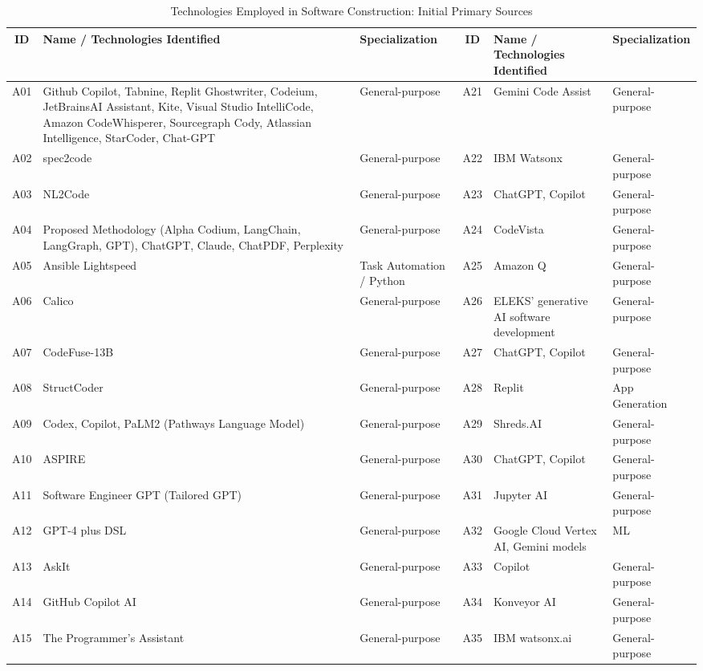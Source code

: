 \begin{table}[ht]
\centering
\caption{Technologies Employed in Software Construction: Initial Primary Sources}
\label{tab:results}
\begin{tabular}{|c|p{5cm}|p{2.5cm}||c|p{5cm}|p{2.5cm}|}
\hline
ID & Name / Technologies Identified & Specialization & ID & Name / Technologies Identified & Specialization \\
\hline
A01 & Github Copilot, Tabnine, Replit Ghostwriter, Codeium, JetBrainsAI Assistant, Kite, Visual Studio IntelliCode, Amazon CodeWhisperer, Sourcegraph Cody, Atlassian Intelligence, StarCoder, Chat-GPT & General-purpose & A21 & Gemini Code Assist & General-purpose \\
\hline
A02 & spec2code & General-purpose & A22 & IBM Watsonx & General-purpose \\
\hline
A03 & NL2Code & General-purpose & A23 & ChatGPT, Copilot & General-purpose \\
\hline
A04 & Proposed Methodology (Alpha Codium, LangChain, LangGraph, GPT), ChatGPT, Claude, ChatPDF, Perplexity & General-purpose & A24 & CodeVista & General-purpose \\
\hline
A05 & Ansible Lightspeed & Task Automation / Python & A25 & Amazon Q & General-purpose \\
\hline
A06 & Calico & General-purpose & A26 & ELEKS’ generative AI software development & General-purpose \\
\hline
A07 & CodeFuse-13B & General-purpose & A27 & ChatGPT, Copilot & General-purpose \\
\hline
A08 & StructCoder & General-purpose & A28 & Replit & App Generation \\
\hline
A09 & Codex, Copilot, PaLM2 (Pathways Language Model) & General-purpose & A29 & Shreds.AI & General-purpose \\
\hline
A10 & ASPIRE & General-purpose & A30 & ChatGPT, Copilot & General-purpose \\
\hline
A11 & Software Engineer GPT (Tailored GPT) & General-purpose & A31 & Jupyter AI & General-purpose \\
\hline
A12 & GPT-4 plus DSL & General-purpose & A32 & Google Cloud Vertex AI, Gemini models & ML \\
\hline
A13 & AskIt & General-purpose & A33 & Copilot & General-purpose \\
\hline
A14 & GitHub Copilot AI & General-purpose & A34 & Konveyor AI & General-purpose \\
\hline
A15 & The Programmer’s Assistant & General-purpose & A35 & IBM watsonx.ai & General-purpose \\

\end{tabular}
\end{table}

